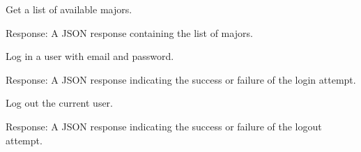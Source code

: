 \documentclass[letterpaper,10pt,english]{sphinxmanual}
\begin{document}
\begin{fulllineitems}
\label{\detokenize{routes.login:routes.login.routes.get_majors}}
\pysigstartsignatures
{}
\pysigstopsignatures
\sphinxAtStartPar
Get a list of available majors.
\begin{description}
\sphinxAtStartPar
Response: A JSON response containing the list of majors.

\end{description}

\end{fulllineitems}


\begin{fulllineitems}
\label{\detokenize{routes.login:routes.login.routes.login}}
\pysigstartsignatures
{}
\pysigstopsignatures
\sphinxAtStartPar
Log in a user with email and password.
\begin{description}
\sphinxAtStartPar
Response: A JSON response indicating the success or failure of the login attempt.

\end{description}

\end{fulllineitems}


\begin{fulllineitems}
\label{\detokenize{routes.login:routes.login.routes.logout_user}}
\pysigstartsignatures
{}
\pysigstopsignatures
\sphinxAtStartPar
Log out the current user.
\begin{description}
\sphinxAtStartPar
Response: A JSON response indicating the success or failure of the logout attempt.

\end{description}

\end{fulllineitems}
\end{document}
